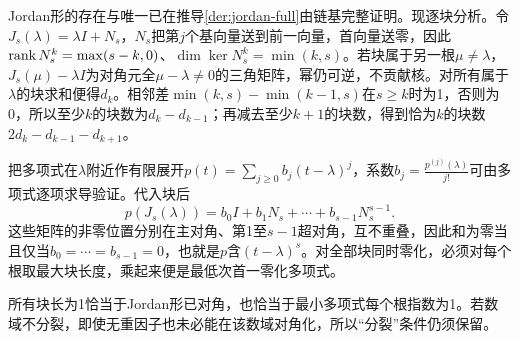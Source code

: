 \label{der:8-4}
Jordan形的存在与唯一已在推导\ref{der:jordan-full}由链基完整证明。现逐块分析。令$J_s(\lambda)=\lambda I+N_s$，$N_s$把第$j$个基向量送到前一向量，首向量送零，因此$\operatorname{rank} N_s^k=\max(s-k,0)$、$\dim\ker N_s^k=\min(k,s)$。若块属于另一根$\mu\ne\lambda$，$J_s(\mu)-\lambda I$为对角元全$\mu-\lambda\ne0$的三角矩阵，幂仍可逆，不贡献核。对所有属于$\lambda$的块求和便得$d_k$。相邻差$\min(k,s)-\min(k-1,s)$在$s\ge k$时为1，否则为0，所以至少$k$的块数为$d_k-d_{k-1}$；再减去至少$k+1$的块数，得到恰为$k$的块数$2d_k-d_{k-1}-d_{k+1}$。

把多项式在$\lambda$附近作有限展开$p(t)=\sum_{j\ge0}b_j(t-\lambda)^j$，系数$b_j=\frac{p^{(j)}(\lambda)}{j!}$可由多项式逐项求导验证。代入块后
\[p(J_s(\lambda))=b_0I+b_1N_s+\cdots+b_{s-1}N_s^{s-1}.\]
这些矩阵的非零位置分别在主对角、第1至$s-1$超对角，互不重叠，因此和为零当且仅当$b_0=\cdots=b_{s-1}=0$，也就是$p$含$(t-\lambda)^s$。对全部块同时零化，必须对每个根取最大块长度，乘起来便是最低次首一零化多项式。

所有块长为1恰当于Jordan形已对角，也恰当于最小多项式每个根指数为1。若数域不分裂，即使无重因子也未必能在该数域对角化，所以“分裂”条件仍须保留。
